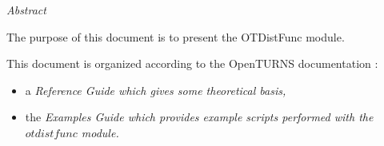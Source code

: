 %  
\vspace{0.5in}
\begin{center}
\vspace{0.3in}
\emph{ Abstract}
\vspace{0.5in}
\end{center}

The purpose of this document is to present the OTDistFunc module.

This document is organized according to the OpenTURNS documentation :
\begin{itemize}
\item a \itshape{Reference Guide} which gives some theoretical basis,
\item the \itshape{Examples Guide} which provides example scripts performed with the $otdistfunc$ module.
\end{itemize}

